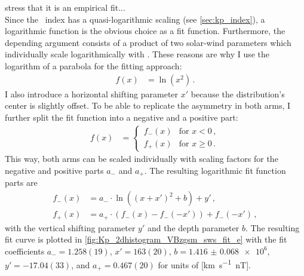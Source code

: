 stress that it is an empirical fit...\\

Since the \Kp~index has a quasi-logarithmic scaling (see \autoref{sec:kp_index}), a logarithmic function is the obvious choice as a fit function. Furthermore, the depending argument consists of a product of two solar-wind parameters which individually scale logarithmically with \Kp{}. These reasons are why I use the logarithm of a parabola for the fitting approach:
\begin{align}
	f(x) &= \ln\left(x^2\right)	\,.	\label{eq:log_square_function}
\end{align}
I also introduce a horizontal shifting parameter $x'$ because the distribution's center is slightly offset. To be able to replicate the asymmetry in both arms, I further split the fit function into a negative and a positive part:
\begin{align}
	f(x) &=
	\begin{cases}
		\,f_-(x) &\text{for } x < 0	\,,\\
		\,f_+(x) &\text{for } x \ge 0	\,.
	\end{cases}	\label{eq:log_square_fit_function}
\end{align}
This way, both arms can be scaled individually with scaling factors for the negative and positive parts $a_-$ and $a_+$. The resulting logarithmic fit function parts are
\begin{align}
	f_-(x) &= a_- \cdot \ln\left(\left(x + x'\right)^2 + b\right) + y'	\,,\\
	f_+(x) &= a_+ \cdot \left(f_-(x) - f_-\left(-x'\right)\right) + f_-\left(-x'\right)	\,,
\end{align}
with the vertical shifting parameter $y'$ and the depth parameter $b$. The resulting fit curve is plotted in \autoref{fig:Kp_2dhistogram_VBzgsm_sws_fit_e} with the fit coefficients $a_- = 1.258(19)$, $x' = 163(20)$, $b = \num{1.416(68)e6}$, $y' = -17.04(33)$, and $a_+ = 0.467(20)$ for units of [\si{\km\per\s \nano\tesla}].
